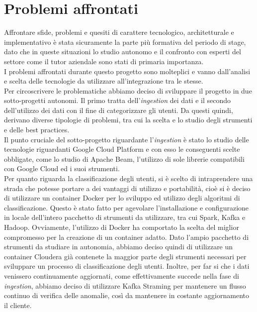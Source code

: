 \section{Problemi affrontati}
Affrontare sfide, problemi e quesiti di carattere tecnologico, architetturale e implementativo è stata sicuramente la parte più formativa del periodo di stage, dato che in queste situazioni lo studio autonomo e il confronto con esperti del settore come il tutor aziendale sono stati di primaria importanza.
\\
I problemi affrontati durante questo progetto sono molteplici e vanno dall'analisi e scelta delle tecnologie da utilizzare all'integrazione tra le stesse.
\\
Per circoscrivere le problematiche abbiamo deciso di sviluppare il progetto in due sotto-progetti autonomi. 
Il primo tratta dell'\emph{ingestion} dei dati e il secondo dell'utilizzo dei dati con il fine di categorizzare gli utenti. Da questi quindi, derivano diverse tipologie di problemi, tra cui la scelta e lo studio degli strumenti e delle \gls{best practices}.
\\
Il punto cruciale del sotto-progetto riguardante l'\emph{ingestion} è stato lo studio delle tecnologie riguardanti Google Cloud Platform e con esso le conseguenti scelte obbligate, come lo studio di Apache Beam, l'utilizzo di sole librerie compatibili con Google Cloud ed i suoi strumenti.
\\
Per quanto riguarda la classificazione degli utenti, si è scelto di intraprendere una strada che potesse portare a dei vantaggi di utilizzo e portabilità, cioè si è deciso di utilizzare un \gls{container} Docker per lo sviluppo ed utilizzo degli algoritmi di classificazione.
Questo è stato fatto per agevolare l'installazione e configurazione in locale dell'intero pacchetto di strumenti da utilizzare, tra cui Spark, Kafka e Hadoop.
Ovviamente, l'utilizzo di Docker ha comportato la scelta del miglior compromesso per la creazione di un container adatto. Dato l'ampio pacchetto di strumenti da studiare in autonomia, abbiamo deciso quindi di utilizzare un container Cloudera \cite{containercloudera} già contenete la maggior parte degli strumenti necessari per sviluppare un processo di classificazione degli utenti.
Inoltre, per far si che i dati venissero continuamente aggiornati, come effettivamente succede nella fase di \emph{ingestion}, abbiamo deciso di utilizzare Kafka Straming per mantenere un flusso continuo di verifica delle anomalie, così da mantenere in costante aggiornamento il cliente.

